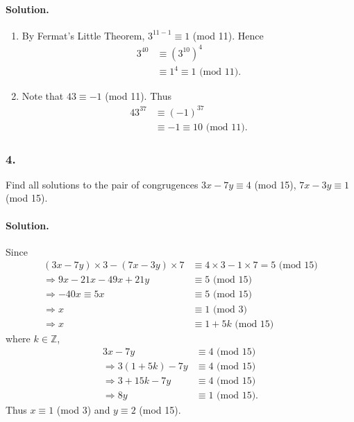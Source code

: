 \paragraph{Solution.}
\begin{enumerate}
    \item By Fermat's Little Theorem, $3^{11-1} \equiv 1$ (mod 11). Hence
    \begin{align*}
        3^{40} &\equiv \left(3^{10}\right)^4 \\
        &\equiv 1^4 \equiv 1 \mbox{ (mod 11)}.
    \end{align*}
    \item Note that $43 \equiv -1$ (mod 11). Thus
    \begin{align*}
        43^{37} &\equiv \left(-1\right)^{37} \\
        &\equiv -1 \equiv 10 \mbox{ (mod 11)}.
    \end{align*}
\end{enumerate}

\subsubsection{4.} Find all solutions to the pair of congrugences
$3x-7y \equiv 4$ (mod 15), $7x-3y \equiv 1$ (mod 15).

\paragraph{Solution.} Since
\begin{align*}
    \left(3x-7y\right)\times 3 - \left(7x-3y\right)\times 7 &\equiv 4\times 3 - 1\times 7 = 5 \mbox{ (mod 15)} \\
    \Rightarrow 9x - 21x - 49x + 21y &\equiv 5 \mbox{ (mod 15)} \\
    \Rightarrow -40x \equiv 5x &\equiv 5 \mbox{ (mod 15)} \\
    \Rightarrow x &\equiv 1 \mbox{ (mod 3)} \\
    \Rightarrow x &\equiv 1 + 5k \mbox{ (mod 15)}
\end{align*}
where $k \in \mathbb{Z}$,
\begin{align*}
    3x-7y &\equiv 4 \mbox{ (mod 15)} \\
    \Rightarrow 3\left(1+5k\right) -7y &\equiv 4 \mbox{ (mod 15)} \\
    \Rightarrow 3+15k-7y &\equiv 4 \mbox{ (mod 15)} \\
    \Rightarrow 8y &\equiv 1 \mbox{ (mod 15)}.
\end{align*}
Thus $x \equiv 1$ (mod 3) and $y \equiv 2$ (mod 15).

